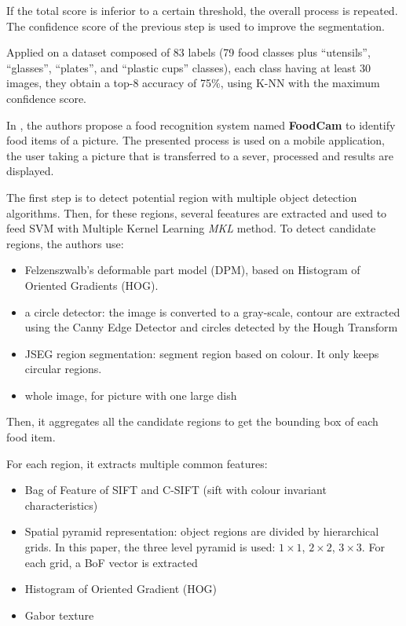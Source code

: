 If the total score is inferior to a certain threshold, the overall process is repeated. The confidence score of the previous step is used to improve the segmentation.

Applied on a dataset composed of 83 labels (79 food classes plus \enquote{utensils}, \enquote{glasses}, \enquote{plates}, and \enquote{plastic cups} classes), each class having at least 30 images, they obtain a top-8 accuracy of 75\%, using K-NN with the maximum confidence score.


In \cite{Matsuda2012a}, the authors propose a food recognition system named \textbf{FoodCam} to identify food items of a picture. The presented process is used on a mobile application, the user taking a picture that is transferred to a sever, processed and results are displayed.

The first step is to detect potential region with multiple object detection algorithms. Then, for these regions, several feeatures are extracted and used to feed SVM with Multiple Kernel Learning \textit{MKL} method. To detect candidate regions, the authors use:
\begin{itemize}
    \item Felzenszwalb’s deformable part model (DPM), based on Histogram of Oriented Gradients (HOG).
    \item a circle detector: the image is converted to a gray-scale, contour are extracted using the Canny Edge Detector and circles detected by the Hough Transform
    \item JSEG region segmentation: segment region based on colour. It only keeps circular regions.
    \item whole image, for picture with one large dish
\end{itemize}
Then, it aggregates all the candidate regions to get the bounding box of each food item.

For each region, it extracts multiple common features:
\begin{itemize}
    \item Bag of Feature of SIFT and C-SIFT (sift with colour invariant characteristics)
    \item Spatial pyramid representation: object regions are divided by hierarchical grids. In this paper, the three level pyramid is used: $1 \times 1$, $2 \times 2$, $3 \times 3$. For each grid, a BoF vector is extracted
    \item Histogram of Oriented Gradient (HOG)
    \item Gabor texture
\end{itemize}

